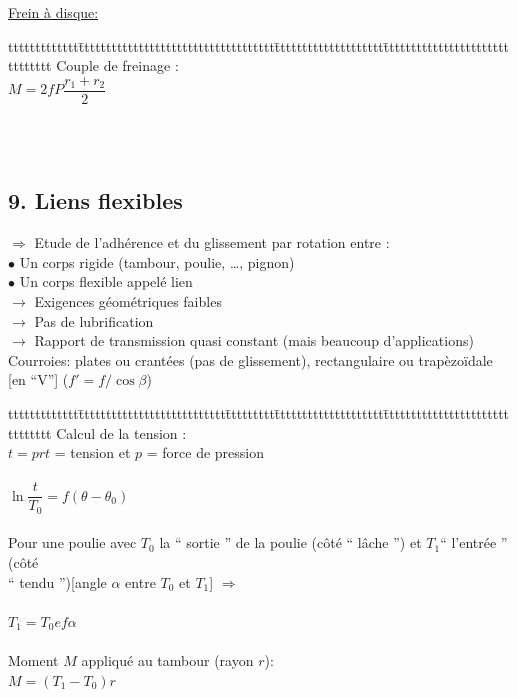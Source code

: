 \underline{Frein à disque:}

\begin{bluebox}
\begin{tabbing}
ttttttttttttt\=tttttttttttttttttttttttttttttttttttt\=tttttttttttttttttttt\=ttttttttttttttttttttttttttttttt\kill
Couple de freinage :\\
\>$M=2fP\dfrac{r_1+r_2}{2}$
\end{tabbing}
\end{bluebox}\\\\

\subsection*{9. Liens flexibles}

$\Rightarrow$ Etude de l’{\color{orange}adhérence} et du {\color{orange}glissement} par rotation entre :\\
$\bullet$ Un corps rigide (tambour, poulie, …, pignon)\\
$\bullet$ Un corps flexible appelé {\color{orange}lien}\\
$\rightarrow$ Exigences géométriques faibles \\
$\rightarrow$ Pas de lubrification\\
$\rightarrow$ Rapport de transmission {\color{orange}quasi} constant (mais beaucoup d’applications)\\

{\color{orange}Courroies}: plates ou crantées (pas de glissement), rectangulaire ou trapèzoïdale [en “V”] ($f'=f/\cos\beta$)\\

\begin{bluebox}
\begin{tabbing}
ttttttttttttt\=ttttttttttttttttttttttttttt\=ttttttttt\=tttttttttttttttttttt\=ttttttttttttttttttttttttttttttt\kill
Calcul de la tension :\\
\>$t=pr$\>\>$t$ = tension et $p$ = force de pression\\\\
\>\>$\ln\dfrac{t}{T_0}=f(\theta-\theta_0)$\\\\
Pour une poulie avec {\color{blue}$T_0$} la “ {\color{blue}sortie} ” de la poulie (côté “ lâche ”) et {\color{green}$T_1$}“ {\color{green}l'entrée} ” (côté \\
“ tendu ”)[angle $\alpha$ entre $T_0$ et $T_1$] $\Rightarrow$ \\\\
\>\>$T_1 = T_0e{f\alpha}$\\\\
Moment $M$ appliqué au tambour (rayon $r$):\\
\>\>$M=(T_1-T_0)r$
\end{tabbing}
\end{bluebox}\\\\

